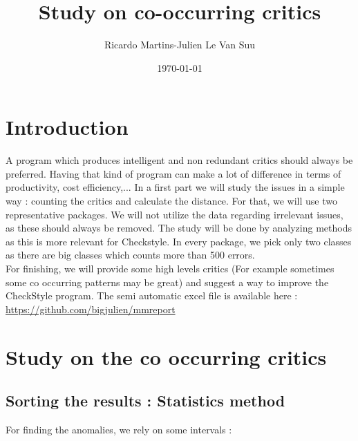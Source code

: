 \documentclass{article}
\begin{document}
\title{Study on co-occurring critics}
\author{Ricardo Martins-Julien Le Van Suu}
\date\today
\maketitle
\section{Introduction}
A program which produces intelligent and non redundant critics should always be preferred. Having that kind of program can make a lot of difference in terms of productivity, cost efficiency,... 
In a first part we will study the issues in a simple way : counting the critics and calculate the distance.
For that, we will use two representative packages. We will not utilize the data regarding irrelevant issues, as these should always be removed. The study will be done by analyzing methods as this is more relevant for Checkstyle. In every package, we pick only two classes as there are big classes which counts more than 500 errors. \\
For finishing, we will provide some high levels critics (For example sometimes some co occurring patterns may be great) and suggest a way to improve the CheckStyle program. The semi automatic excel file is available here : \url{https://github.com/bigjulien/mmreport}

\section{Study on the co occurring critics}

\subsection{Sorting the results : Statistics method} 
For finding the anomalies, we rely on some intervals : 
\end{document}
